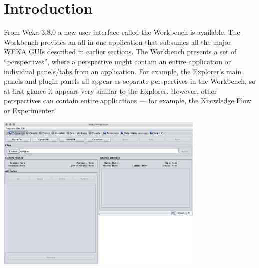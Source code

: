 %
%
%
%



\section{Introduction}

From Weka 3.8.0 a new user interface called the Workbench is
available. The Workbench provides an all-in-one application that
subsumes all the major WEKA GUIs described in earlier sections. The
Workbench presents a set of ``perspectives'', where a perspective
might contain an entire application or individual panels/tabs from an
application. For example, the Explorer's main panels and plugin panels
all appear as separate perspectives in the Workbench, so at first
glance it appears very similar to the Explorer. However, other
perspectives can contain entire applications --- for example, the
Knowledge Flow or Experimenter.

\begin{center}
  \includegraphics[width=10cm]{images/workbench/workbench.eps}
\end{center}

